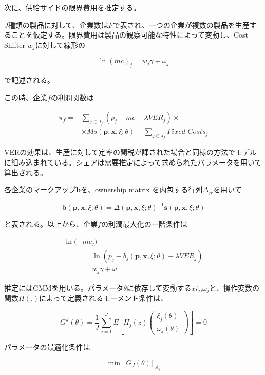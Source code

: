 \documentclass{jsarticle}
\begin{document}
\begin{enumerate}
\vspace{2zw}

次に、供給サイドの限界費用を推定する。

$J$種類の製品に対して、企業数は$F$で表され、一つの企業が複数の製品を生産することを仮定する。限界費用は製品の観察可能な特性によって変動し、Cost Shifter $w_j$に対して線形の

\[ \ln (mc)_j = w_j \gamma + \omega_j \]

で記述される。

この時、企業$f$の利潤関数は

 \begin{align*}
 \pi_f = & \sum_{j \in J_f} (p_j -mc -\lambda \textit{VER}_j) \times \\
  & \times Ms(\mathbf{p}, \mathbf{x}, \xi ; \theta) - \sum_{j \in J_f} \textit{Fixed Costs}_j
 \end{align*}

VERの効果は、生産に対して定率の関税が課された場合と同様の方法でモデルに組み込まれている。シェアは需要推定によって求められたパラメータを用いて算出される。

各企業のマークアップ$\mathbf{b}$を、ownership matrix を内包する行列$\Delta_{jr}$を用いて

\[\mathbf{b}(\mathbf{p}, \mathbf{x}, \xi ; \theta) 
= \Delta(\mathbf{p}, \mathbf{x}, \xi ; \theta)^{-1} \mathbf{s}(\mathbf{p}, \mathbf{x}, \xi ; \theta) \]

と表される。以上から、企業$f$の利潤最大化の一階条件は

 \begin{align*}
 \ln( &mc_j) \\
  & = \ln (p_j - b_j (\mathbf{p}, \mathbf{x}, \xi ; \theta ) - \lambda \textit{VER}_j ) \\
  & = w_j \gamma + \omega
 \end{align*}

\vspace{2zw}

推定にはGMMを用いる。パラメータ$\theta$に依存して変動する$xi_j$,$\omega_j$と、操作変数の関数$H(.)$によって定義されるモーメント条件は、

\[G^J(\theta) = \dfrac{1}{J} \sum ^J_{j=1} E \left[ H_j(z) \begin{pmatrix}
\xi_j(\theta) \\
\omega_j(\theta)
\end{pmatrix}
 \right] = 0\]

パラメータの最適化条件は

\[  \min ||G_J (\theta) ||_{A_j} \]


\end{enumerate}
\end{document}

